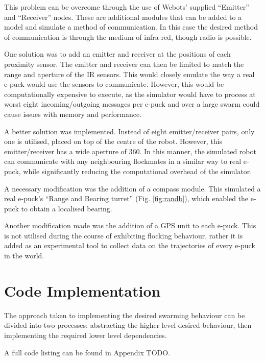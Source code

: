 This problem can be overcome through the use of Webots' supplied ``Emitter'' and ``Receiver'' nodes. These are additional modules that can be added to a model and simulate a method of communication. In this case the desired method of communication is through the medium of infra-red, though radio is possible.

One solution was to add an emitter and receiver at the positions of each proximity sensor. The emitter and receiver can then be limited to match the range and aperture of the IR sensors. This would closely emulate the way a real e-puck would use the sensors to communicate. However, this would be computationally expensive to execute, as the simulator would have to process at worst eight incoming/outgoing messages per e-puck and over a large swarm could cause issues with memory and performance.

A better solution was implemented. Instead of eight emitter/receiver pairs, only one is utilised, placed on top of the centre of the robot. However, this emitter/receiver has a wide aperture of 360\textdegree. In this manner, the simulated robot can communicate with any neighbouring flockmates in a similar way to real e-puck, while significantly reducing the computational overhead of the simulator.

A necessary modification was the addition of a compass module. This simulated a real e-puck's ``Range and Bearing turret'' (Fig. \ref{fig:randb}), which enabled the e-puck to obtain a localised bearing.

Another modification made was the addition of a GPS unit to each e-puck. This is not utilised during the course of exhibiting flocking behaviour, rather it is added as an experimental tool to collect data on the trajectories of every e-puck in the world.

\section{Code Implementation}
\label{section:code}

The approach taken to implementing the desired swarming behaviour can be divided into two processes: abstracting the higher level desired behaviour, then implementing the required lower level dependencies.

A full code listing can be found in Appendix TODO.

